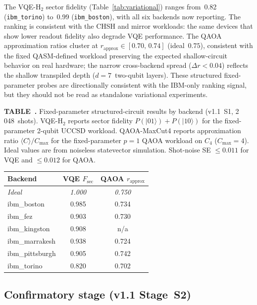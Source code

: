 \documentclass[aps,prxquantum,twocolumn,superscriptaddress,amsmath,amssymb,longbibliography,floatfix]{revtex4-2}
\begin{document}
The VQE-H$_2$ sector fidelity (Table~\ref{tab:variational}) ranges from~0.82 (\texttt{ibm\_torino}) to~0.99 (\texttt{ibm\_boston}), with all six backends now reporting. The ranking is consistent with the CHSH and mirror workloads: the same devices that show lower readout fidelity also degrade VQE performance. The QAOA approximation ratios cluster at $r_{\text{approx}} \in [0.70,\, 0.74]$ (ideal~$0.75$), consistent with the fixed QASM-defined workload preserving the expected shallow-circuit behavior on real hardware; the narrow cross-backend spread ($\Delta r < 0.04$) reflects the shallow transpiled depth ($d{=}7$~two-qubit layers). These structured fixed-parameter probes are directionally consistent with the IBM-only ranking signal, but they should not be read as standalone variational experiments.

\begin{center}
\begin{minipage}{\columnwidth}
\label{tab:variational}
\small
\textbf{TABLE~\thetable.} Fixed-parameter structured-circuit results by backend (v1.1~S1, 2\,048~shots). VQE-H$_2$ reports sector fidelity $P(|01\rangle){+}P(|10\rangle)$ for the fixed-parameter 2-qubit UCCSD workload. QAOA-MaxCut4 reports approximation ratio $\langle C\rangle / C_{\max}$ for the fixed-parameter $p{=}1$ QAOA workload on $C_4$ ($C_{\max}{=}4$). Ideal values are from noiseless statevector simulation. Shot-noise SE $\leq 0.011$ for VQE and $\leq 0.012$ for QAOA.

\begin{tabular}{lcc}
\toprule
Backend & VQE $F_{\text{sec}}$ & QAOA $r_{\text{approx}}$ \\
\midrule
\textit{Ideal} & \textit{1.000} & \textit{0.750} \\
\midrule
ibm\_boston     & 0.985 & 0.734 \\
ibm\_fez       & 0.903 & 0.730 \\
ibm\_kingston  & 0.908 & n/a \\
ibm\_marrakesh & 0.938 & 0.724 \\
ibm\_pittsburgh& 0.905 & 0.742 \\
ibm\_torino    & 0.820 & 0.702 \\
\bottomrule
\end{tabular}
\end{minipage}
\end{center}

\subsection{Confirmatory stage (v1.1 Stage~S2)}
\label{sec:s2}
\end{document}
